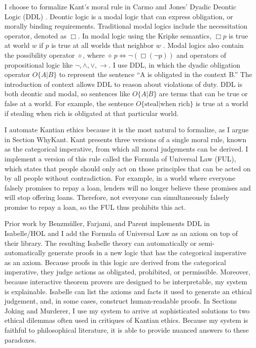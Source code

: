 \begin{isabellebody}
\begin{isamarkuptext}
I choose to formalize Kant's moral rule in Carmo and Jones' Dyadic Deontic Logic (DDL) \citep{CJDDL}. Deontic 
logic is a modal logic that can express obligation, or morally binding requirements. Traditional modal 
logics include the necessitation operator, denoted as $\Box$. In modal logic using the Kripke semantics, 
$\Box p$ is true at world $w$ if $p$ is true at all worlds that neighbor $w$ \citep{cresswell}. Modal 
logics  also contain the possibility operator $\diamond$, where $\diamond \, p \iff \neg (\Box (\neg p))$ 
and operators of propositional logic like $\neg, \wedge, \vee, \rightarrow$. I use DDL, in which
the dyadic obligation operator $O\{A \vert B\}$ to represent the sentence ``A is obligated in the context B.'' 
The introduction of context allows DDL to reason about violations of duty. DDL is both deontic and modal, 
so sentences like $O\{A \vert B\}$ are terms that can be true or false at a world. For example, the 
sentence $O \{ \text{steal} \vert \text{when rich}\}$ is true at a world if stealing when rich is 
obligated at that particular world. 

I automate Kantian ethics because it is the most natural to formalize, as I argue in Section WhyKant. 
Kant presents three versions of a single moral rule, known as the categorical imperative, from which 
all moral judgements can be derived. I implement a version of this rule called the Formula of Universal 
Law (FUL), which states that people should only act on those principles that can be acted on by all 
people without contradiction. For example, in a world where everyone falsely promises to repay a loan, 
lenders will no longer believe these promises and will stop offering loans. Therefore, not everyone 
can simultaneously falsely promise to repay a loan, so the FUL thus prohibits this act.

Prior work by Benzmüller, Farjami, and Parent \citep{logikey, BFP} implements DDL in Isabelle/HOL and 
I add the Formula of Universal Law as an axiom on top of their library. The resulting Isabelle theory 
can automatically or semi-automatically generate proofs in a new logic that has the categorical 
imperative as an axiom. Because proofs in this logic are derived from the categorical imperative, 
they judge actions as obligated, prohibited, or permissible. Moreover, because interactive 
theorem provers are designed to be interpretable, my system is explainable. Isabelle can list 
the axioms and facts it used to generate an ethical judgement, and, in some cases, construct 
human-readable proofs. In Sections Joking and Murderer, I use my system to arrive at 
sophisticated solutions to two ethical dilemmas often used in critiques of Kantian ethics. Because 
my system is faithful to philosophical literature, it is able to provide nuanced answers to these paradoxes. 


\end{isamarkuptext}
\end{isabellebody}
